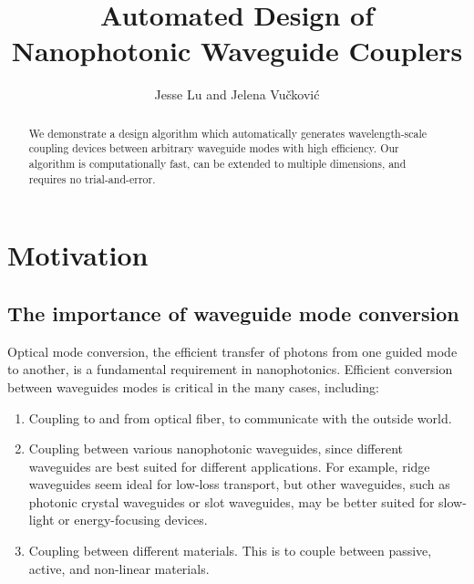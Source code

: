 \documentclass[letterpaper,10pt]{article}
\begin{document}
\title{Automated Design of Nanophotonic Waveguide Couplers}
\author{Jesse Lu and Jelena Vu\v{c}kovi\'{c}}

\maketitle
\begin{abstract}
We demonstrate a design algorithm which automatically generates 
    wavelength-scale coupling devices between arbitrary waveguide modes 
    with high efficiency.
Our algorithm is computationally fast, 
    can be extended to multiple dimensions,
    and requires no trial-and-error.
\end{abstract}


\section{Motivation}

\subsection{The importance of waveguide mode conversion}
Optical mode conversion, 
    the efficient transfer of photons from one guided mode to another,
    is a fundamental requirement in nanophotonics.
Efficient conversion between waveguides modes
    is critical in the many cases, including:
\begin{enumerate}
    \item Coupling to and from optical fiber\cite{}, 
        to communicate with the outside world.
    \item Coupling between various nanophotonic waveguides, 
        since different waveguides are best suited for different applications.
        For example, ridge waveguides seem ideal for low-loss transport\cite{},
            but other waveguides, 
            such as photonic crystal waveguides or slot waveguides,
            may be better suited for slow-light\cite{} 
            or energy-focusing devices\cite{}.
    \item Coupling between different materials.
       This is to couple between passive, active\cite{}, 
        and non-linear\cite{} materials. 
\end{enumerate}
\end{document}
